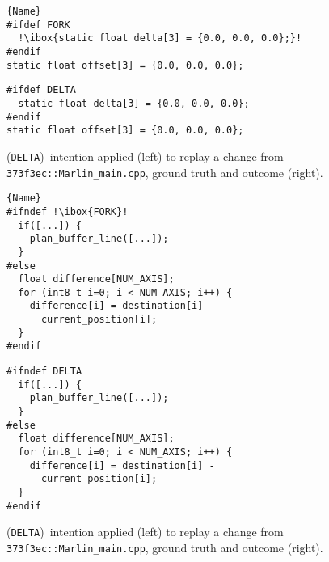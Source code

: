 \begin{figure}[ht]
    \centering
    \begin{minipage}{.57\textwidth}
\begin{lstlisting}[caption=Wrapped code by PC,escapechar=!]{Name}
#ifdef FORK
  !\ibox{static float delta[3] = {0.0, 0.0, 0.0};}!
#endif
static float offset[3] = {0.0, 0.0, 0.0};
\end{lstlisting}
\end{minipage}\qquad
\begin{minipage}{.57\textwidth}
\begin{lstlisting}
#ifdef DELTA
  static float delta[3] = {0.0, 0.0, 0.0};
#endif
static float offset[3] = {0.0, 0.0, 0.0};
\end{lstlisting}

    \end{minipage}
    \caption{\keepasf(\texttt{DELTA})~intention applied (left) to replay a change from \texttt{373f3ec::Marlin\_main.cpp}, ground truth and outcome (right).}
    \label{fig:keep-as-feature}
\end{figure}


\begin{figure}[ht]
    \centering
    \begin{minipage}{.59\textwidth}
\begin{lstlisting}[caption=Wrapped code by PC,escapechar=!]{Name}
#ifndef !\ibox{FORK}!
  if([...]) {
    plan_buffer_line([...]);
  }
#else
  float difference[NUM_AXIS];
  for (int8_t i=0; i < NUM_AXIS; i++) {
    difference[i] = destination[i] -
      current_position[i];
  }
#endif

\end{lstlisting}
\end{minipage}\qquad
\begin{minipage}{.59\textwidth}
\begin{lstlisting}
#ifndef DELTA
  if([...]) {
    plan_buffer_line([...]);
  }
#else
  float difference[NUM_AXIS];
  for (int8_t i=0; i < NUM_AXIS; i++) {
    difference[i] = destination[i] -
      current_position[i];
  }
#endif
\end{lstlisting}

    \end{minipage}
    \caption{\changepc(\texttt{DELTA})~intention applied (left) to replay a change from \texttt{373f3ec::Marlin\_main.cpp}, ground truth and outcome (right).}
    \label{fig:change-pc}
\end{figure}


